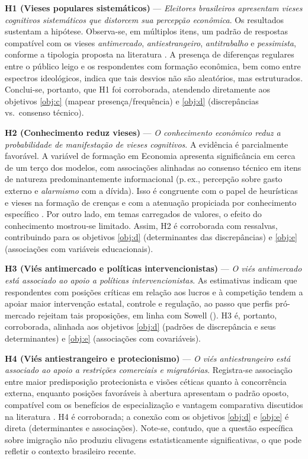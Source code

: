 \textbf{H1 (Vieses populares sistemáticos)} — \textit{Eleitores brasileiros apresentam vieses cognitivos sistemáticos que distorcem sua percepção econômica}. Os resultados sustentam a hipótese. Observa-se, em múltiplos itens, um padrão de respostas compatível com os vieses \emph{antimercado}, \emph{antiestrangeiro}, \emph{antitrabalho} e \emph{pessimista}, conforme a tipologia proposta na literatura \cite{The_Myth_of_the_Rational_Voter}. A presença de diferenças regulares entre o público leigo e os respondentes com formação econômica, bem como entre espectros ideológicos, indica que tais desvios não são aleatórios, mas estruturados. Conclui-se, portanto, que H1 foi corroborada, atendendo diretamente aos objetivos \autoref{obj:c} (mapear presença/frequência) e \autoref{obj:d} (discrepâncias vs.\ consenso técnico).

\textbf{H2 (Conhecimento reduz vieses)} — \textit{O conhecimento econômico reduz a probabilidade de manifestação de vieses cognitivos}. A evidência é parcialmente favorável. A variável de formação em Economia apresenta significância em cerca de um terço dos modelos, com associações alinhadas ao consenso técnico em itens de natureza predominantemente informacional (p.\,ex., percepção sobre gasto externo e \emph{alarmismo} com a dívida). Isso é congruente com o papel de heurísticas e vieses na formação de crenças e com a atenuação propiciada por conhecimento específico \cite{kahneman2011thinking,Judgment_under_Uncertainty, The_Myth_of_the_Rational_Voter}. Por outro lado, em temas carregados de valores, o efeito do conhecimento mostrou-se limitado. Assim, H2 é corroborada com ressalvas, contribuindo para os objetivos \autoref{obj:d} (determinantes das discrepâncias) e \autoref{obj:e} (associações com variáveis educacionais).

\textbf{H3 (Viés antimercado e políticas intervencionistas)} — \textit{O viés antimercado está associado ao apoio a políticas intervencionistas}. As estimativas indicam que respondentes com posições críticas em relação aos lucros e à competição tendem a apoiar maior intervenção estatal, controle e regulação, ao passo que perfis pró-mercado rejeitam tais proposições, em linha com Sowell (\citeyear{sowell2000basic,sowell2007conflict,sowell2004applied}). H3 é, portanto, corroborada, alinhada aos objetivos \autoref{obj:d} (padrões de discrepância e seus determinantes) e \autoref{obj:e} (associações com covariáveis).

\textbf{H4 (Viés antiestrangeiro e protecionismo)} — \textit{O viés antiestrangeiro está associado ao apoio a restrições comerciais e migratórias}. Registra-se associação entre maior predisposição protecionista e visões céticas quanto à concorrência externa, enquanto posições favoráveis à abertura apresentam o padrão oposto, compatível com os benefícios de especialização e vantagem comparativa discutidos na literatura \cite{bhagwati2003free, The_Myth_of_the_Rational_Voter}. H4 é corroborada; a conexão com os objetivos \autoref{obj:d} e \autoref{obj:e} é direta (determinantes e associações). Note-se, contudo, que a questão específica sobre imigração não produziu clivagens estatisticamente significativas, o que pode refletir o contexto brasileiro recente.

